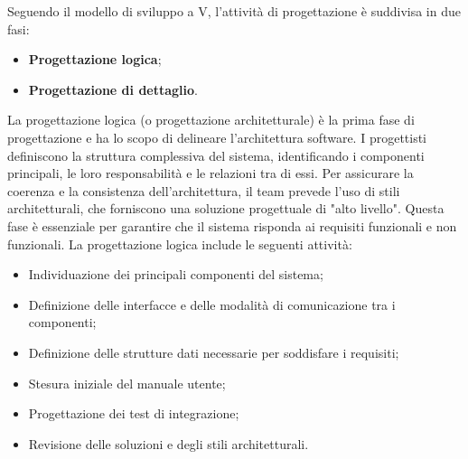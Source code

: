 \label{fasi-progettazione}
\par Seguendo il modello di sviluppo a V, l'attività di progettazione è suddivisa in due fasi: 
\begin{itemize}
  \item \textbf{Progettazione logica};
  \item \textbf{Progettazione di dettaglio}.
\end{itemize}

\label{progettazione-logica}
\par La progettazione logica (o progettazione architetturale) è la prima fase di progettazione e ha lo scopo di delineare l'architettura software. I progettisti definiscono la struttura complessiva del sistema, identificando i componenti principali, le loro responsabilità e le relazioni tra di essi. Per assicurare la coerenza e la consistenza dell'architettura, il team prevede l'uso di stili architetturali, che forniscono una soluzione progettuale di "alto livello". Questa fase è essenziale per garantire che il sistema risponda ai requisiti funzionali e non funzionali. La progettazione logica include le seguenti attività:
\begin{itemize}
  \item Individuazione dei principali componenti del sistema;
  \item Definizione delle interfacce e delle modalità di comunicazione tra i componenti;
  \item Definizione delle strutture dati necessarie per soddisfare i requisiti;
  \item Stesura iniziale del manuale utente;
  \item Progettazione dei test di integrazione;
  \item Revisione delle soluzioni e degli stili architetturali.
\end{itemize}

